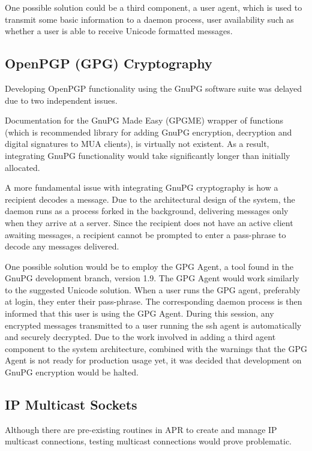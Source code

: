 One possible solution could be a third component, a user
agent, which is used to transmit some basic information to a daemon
process, user availability such as whether a user is able to receive 
Unicode formatted messages.

\subsection{OpenPGP (GPG) Cryptography}

Developing OpenPGP functionality using the GnuPG software
suite was delayed due to two independent issues.

Documentation for the GnuPG Made Easy (GPGME) wrapper of
functions (which is recommended library for adding GnuPG encryption,
decryption and digital signatures to MUA clients), is virtually not
existent. As a result, integrating GnuPG functionality would take
significantly longer than initially allocated.


A more fundamental issue with integrating GnuPG cryptography 
is how a recipient decodes a message. Due to the architectural 
design of the system, the daemon runs as a process forked in the 
background, delivering messages only when they arrive at a server. 
Since the recipient does not have an active client awaiting messages, 
a recipient cannot be prompted to enter a pass-phrase to decode any 
messages delivered. 

One possible solution would be to employ the GPG Agent, a 
tool found in the GnuPG development branch, version 1.9. The GPG
Agent would work similarly to the suggested Unicode solution. When a
user runs the GPG agent, preferably at login, they enter their
pass-phrase. The corresponding daemon process is then informed that
this user is using the GPG Agent. During this session, any encrypted 
messages transmitted to a user running the ssh agent is automatically
and securely decrypted. Due to the work involved in adding a third
agent component to the system architecture, combined with the
warnings that the GPG Agent is not ready for production usage yet, it
was decided that development on GnuPG encryption would be halted.

\subsection{IP Multicast Sockets}

Although there are pre-existing routines in APR to create and
manage IP multicast connections, testing multicast connections would
prove problematic. 

